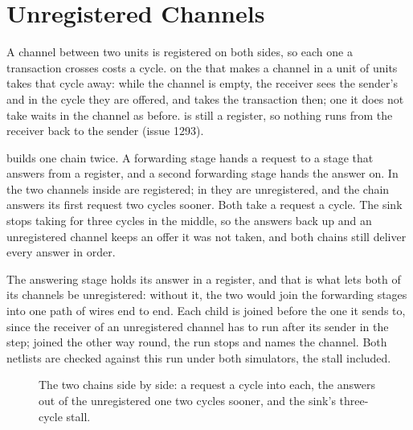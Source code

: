 \section{Unregistered Channels}
\label{sec:x-unreg}

A channel between two units is registered on both sides, so each one a
transaction crosses costs a cycle. \code{\#[unregistered]} on the
 that makes a channel in a unit of units takes that cycle
away: while the channel is empty, the receiver sees the sender's
 and  in the cycle they are offered, and takes
the transaction then; one it does not take waits in the channel as
before.  is still a register, so nothing runs from the
receiver back to the sender (issue 1293).

 builds one chain twice. A forwarding stage hands a
request to a stage that answers from a register, and a second
forwarding stage hands the answer on. In  the two channels
inside are registered; in  they are unregistered, and the
chain answers its first request two cycles sooner. Both take a request
a cycle. The sink stops taking for three cycles in the middle, so the
answers back up and an unregistered channel keeps an offer it was not
taken, and both chains still deliver every answer in order.

The answering stage holds its answer in a register, and that is what
lets both of its channels be unregistered: without it, the two would
join the forwarding stages into one path of wires end to end. Each
child is joined before the one it sends to, since the receiver of an
unregistered channel has to run after its sender in the step; joined
the other way round, the run stops and names the channel. Both
netlists are checked against this run under both simulators, the
stall included.

\begin{figure}[htbp]
\centering

\caption{The two chains side by side: a request a cycle into each, the
answers out of the unregistered one two cycles sooner, and the sink's
three-cycle stall.}
\label{fig:x-unreg}
\end{figure}




